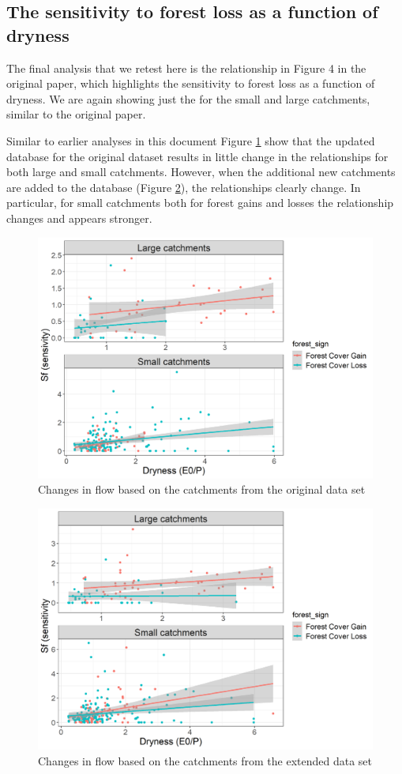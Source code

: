 \documentclass[]{elsarticle} %
\begin{document}
\hypertarget{the-sensitivity-to-forest-loss-as-a-function-of-dryness}{%
\subsection{The sensitivity to forest loss as a function of dryness}\label{the-sensitivity-to-forest-loss-as-a-function-of-dryness}}

The final analysis that we retest here is the relationship in Figure 4 in the original \citet{zhang2017} paper, which highlights the sensitivity to forest loss as a function of dryness. We are again showing just the for the small and large catchments, similar to the original paper.

Similar to earlier analyses in this document Figure \ref{fig:Fig4Zhang} show that the updated database for the original dataset results in little change in the relationships for both large and small catchments. However, when the additional new catchments are added to the database (Figure \ref{fig:Fig4Zhangnew}), the relationships clearly change. In particular, for small catchments both for forest gains and losses the relationship changes and appears stronger.

\begin{figure}
\includegraphics[width=0.9\linewidth]{Fig4Zhang} \caption{Changes in flow based on the catchments from the original data set}\label{fig:Fig4Zhang}
\end{figure}

\begin{figure}
\includegraphics[width=0.9\linewidth]{Fig4Zhang_all} \caption{Changes in flow based on the catchments from the extended data set}\label{fig:Fig4Zhangnew}
\end{figure}


\end{document}
